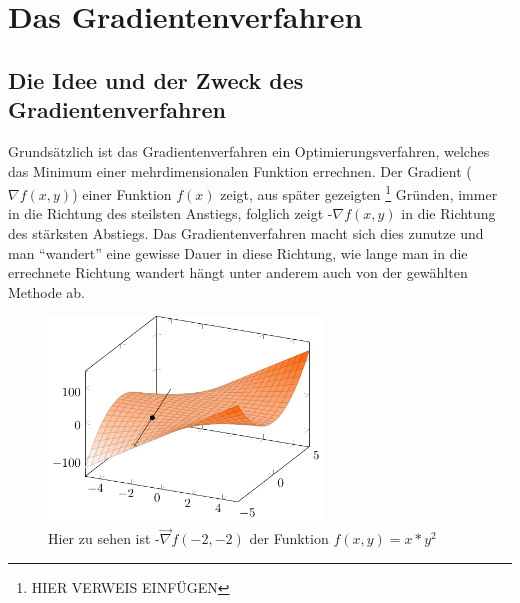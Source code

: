 \documentclass[naustrian]{article}
\begin{document}
{\section{Das Gradientenverfahren}

\subsection{Die Idee und der Zweck des Gradientenverfahren}

Grundsätzlich ist das Gradientenverfahren ein Optimierungsverfahren, welches
das Minimum einer mehrdimensionalen Funktion errechnen. Der Gradient
(${\nabla}f(x,y)$) einer Funktion \(f(x)\) zeigt, aus später gezeigten
\footnote{HIER VERWEIS EINFÜGEN} Gründen, immer in die Richtung des steilsten
Anstiegs, folglich zeigt -${\nabla}f(x,y)$ in die Richtung des stärksten
Abstiegs. Das Gradientenverfahren macht sich dies zunutze und man ``wandert''
eine gewisse Dauer in diese Richtung, wie \textquotedbl{}lange\textquotedbl{}
man in die errechnete Richtung \textquotedbl{}wandert\textquotedbl{} hängt
unter anderem auch von der gewählten Methode ab.

\begin{figure}[h]
    \centering
    \includegraphics[width=0.65\textwidth]{grad/figure0}
    \caption[Gradientenvektor Beispiel] {Hier zu sehen ist -$\vec{\nabla}f(-2,-2)$ der Funktion $f(x,y)=x*y^2$}
\end{figure}

}
\end{document}
